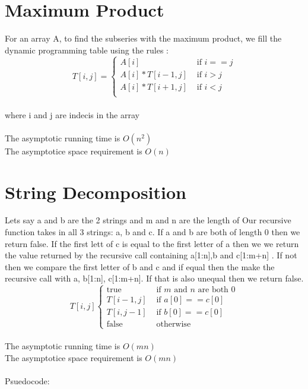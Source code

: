\documentclass{article}
\begin{document}
\section{Maximum Product}
\label{sec:Maximum Product}
    For an array A, to find the subseries with the maximum product, we fill the dynamic programming table using the rules :
    \[
    T[i,j] =
    \begin{cases}
        A[i] &\text{ if } i == j\\
        A[i] * T[i-1, j] &\text{ if } i > j\\
        A[i] * T[i+1, j] &\text{ if } i < j\\
    \end{cases}
    \] \\where i and j are indecis in the array\\\\
    The asymptotic running time is $O(n^2)$\\
    The asymptotice space requirement is $O(n)$\\

\section{String Decomposition}
\label{sec:String Decomposition}
    Lets say a and b are the 2 strings and m and n are the length of
    Our recursive function takes in all 3 strings: a, b and c. If a and b are both of length 0 then we return false. If the first lett of c is equal to the first letter of a then we we return the value returned by the recursive call containing a[1:n],b and c[1:m+n] .
    If not then we compare the first letter of b and c and if equal then the make the recursive call with a, b[1:n], c[1:m+n]. If that is also unequal then we return false.
    \\
    \[
    T[i,j]
    \begin{cases}
        \text{true} &\text{ if }m \text{ and } n \text{ are both 0}\\
        T[i-1, j]&\text{ if }a[0] == c[0]\\
        T[i, j-1]&\text{ if }b[0] == c[0]\\
        \text{false} &\text{ otherwise}
    \end{cases}
    \]\\
    The asymptotic running time is $O(mn)$\\
    The asymptotice space requirement is $O(mn)$\\\\Psuedocode:
\end{document}
